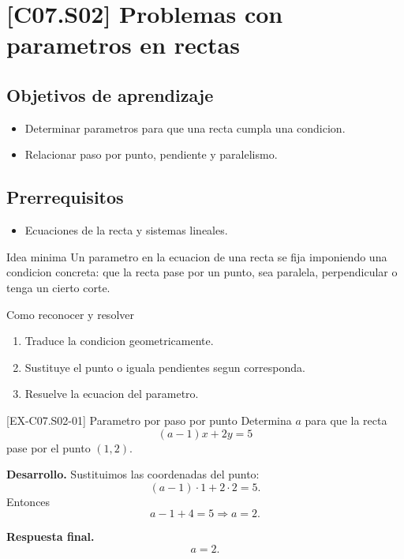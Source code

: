 \section{[C07.S02] Problemas con parametros en rectas}

\subsection*{Objetivos de aprendizaje}
\begin{itemize}
  \item Determinar parametros para que una recta cumpla una condicion.
  \item Relacionar paso por punto, pendiente y paralelismo.
\end{itemize}

\subsection*{Prerrequisitos}
\begin{itemize}
  \item Ecuaciones de la recta y sistemas lineales.
\end{itemize}

\begin{theorybox}{Idea minima}
Un parametro en la ecuacion de una recta se fija imponiendo una condicion concreta: que la
recta pase por un punto, sea paralela, perpendicular o tenga un cierto corte.
\end{theorybox}

\begin{methodbox}{Como reconocer y resolver}
\begin{enumerate}
  \item Traduce la condicion geometricamente.
  \item Sustituye el punto o iguala pendientes segun corresponda.
  \item Resuelve la ecuacion del parametro.
\end{enumerate}
\end{methodbox}

\begin{solvedexample}{[EX-C07.S02-01] Parametro por paso por punto}
Determina \(a\) para que la recta
\[
(a-1)x+2y=5
\]
pase por el punto \((1,2)\).

\textbf{Desarrollo.} Sustituimos las coordenadas del punto:
\[
(a-1)\cdot 1+2\cdot 2=5.
\]
Entonces
\[
a-1+4=5 \Longrightarrow a=2.
\]

\textbf{Respuesta final.}
\[
a=2.
\]
\end{solvedexample}


